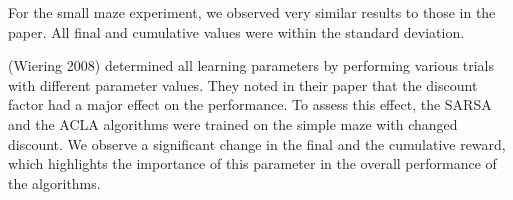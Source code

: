 For the small maze experiment, we observed very similar results to those
in the paper. All final and cumulative values were within the standard
deviation.

(Wiering 2008) determined all learning parameters by performing various
trials with different parameter values. They noted in their paper that
the discount factor had a major effect on the performance. To assess
this effect, the SARSA and the ACLA algorithms were trained on the
simple maze with changed discount. We observe a significant change in
the final and the cumulative reward, which highlights the importance of
this parameter in the overall performance of the algorithms.
